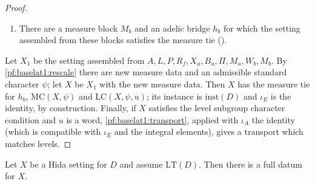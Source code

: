 \begin{proof}
\begin{enumerate}[label=(\arabic*)]
  ().
\item There are a measure block $M_b$ and an adelic bridge $h_b$ for which the setting assembled from these blocks
  satisfies the measure tie ().
\end{enumerate}
Let $X_1$ be the setting assembled from $A,L,P,R_f,X_u,B_u,\Pi,M_u,W_b,M_b$. By \cref{pf:baselat1:rescale} there are new
measure data and an admissible standard character $\psi$; let $X$ be $X_1$ with the new measure data. Then $X$ has the
measure tie for $h_b$, $\mathrm{MC}(X,\psi)$ and $\mathrm{LC}(X,\psi,u)$; its instance is $\mathrm{inst}(D)$ and $\iota_E$ is the
identity, by construction. Finally, if $X$ satisfies the level subgroup character condition and $u$ is a word,
\cref{pf:baselat1:transport}, applied with $\iota_A$ the identity (which is compatible with $\iota_E$ and the integral
elements), gives a transport which matches levels.
\end{proof}

\begin{theorem}\label{pf:baselat1:fulldata}
Let $X$ be a Hida setting for $D$ and assume $\mathrm{LT}(D)$. Then there is a full datum for $X$.
\end{theorem}

